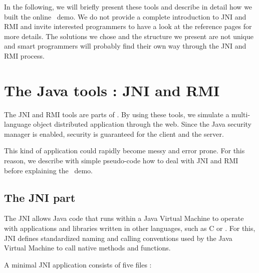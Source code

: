 In the following, we will briefly present these tools and describe in
detail how we built the online \cgal\ demo. We do not provide a
complete introduction to JNI and RMI and invite interested programmers
to have a look at the  reference
pages  for more details. The solutions 
we chose and the structure we present are not unique and smart programmers will
probably find their own way through the JNI and RMI process.

\section{The Java tools : JNI and RMI}
\label{sec:jmi_and_rmi}

The JNI and RMI tools are parts of 
. 
By using these tools, we simulate a multi-language 
object distributed application through the web. Since the Java security 
manager is enabled, security is guaranteed for the client and the server.

This kind of application could rapidly become messy and error
prone. For this reason, we describe with simple pseudo-code how to
deal with JNI and RMI before explaining the \cgal\ demo.

\subsection{The JNI part}
\label{sec:jni_part}

The JNI allows Java code that runs within a Java Virtual Machine 
to operate with applications and libraries written in other languages,
such as C or \CC. For this, JNI defines standardized naming
and calling conventions used by the Java Virtual Machine to call
native methods and functions. 

A minimal JNI application consists of five files : 

